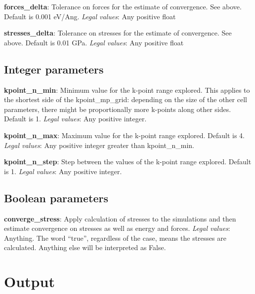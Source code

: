 \documentclass[10pt]{article}
\begin{document}
\textbf{forces\_delta}: Tolerance on forces for the estimate of convergence. See above. Default is 0.001 eV/Ang.\newline
\textit{Legal values}: Any positive float\newline

\textbf{stresses\_delta}: Tolerance on stresses for the estimate of convergence. See above. Default is 0.01 GPa.\newline
\textit{Legal values}: Any positive float\newline

\subsection{Integer parameters}

\textbf{kpoint\_n\_min}: Minimum value for the k-point range explored. This applies to the shortest side of the kpoint\_mp\_grid: depending on the size of the other cell parameters, there might be proportionally more k-points along other sides. Default is 1.\newline
\textit{Legal values}: Any positive integer.\newline

\textbf{kpoint\_n\_max}: Maximum value for the k-point range explored. Default is 4.\newline
\textit{Legal values}: Any positive integer greater than kpoint\_n\_min.\newline

\textbf{kpoint\_n\_step}: Step between the values of the k-point range explored. Default is 1.\newline
\textit{Legal values}: Any positive integer.\newline

\subsection{Boolean parameters}

\textbf{converge\_stress}: Apply calculation of stresses to the simulations and then estimate convergence on stresses as well as energy and forces.\newline
\textit{Legal values}: Anything. The word ``true'', regardless of the case, means the stresses are calculated. Anything else will be interpreted as False.\newline

\section{Output}
\end{document}
